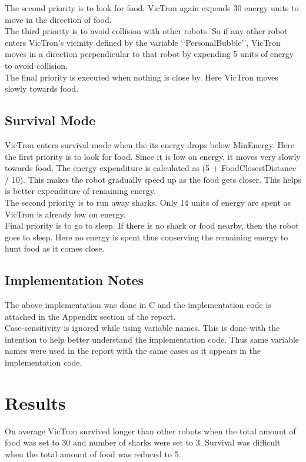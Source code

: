 \documentclass[12pt]{article}
\begin{document}
The second priority is to look for food. VicTron again expends 30 energy units to move in the direction of food. \\

The third priority is to avoid collision with other robots. So if any other robot enters VicTron's vicinity defined by the variable \lq\lq{PersonalBubble}\rq\rq{}, VicTron moves in a direction perpendicular to that robot by expending 5 units of energy to avoid collision. \\

The final priority is executed when nothing is close by. Here VicTron moves slowly towards food. 

\subsection{Survival Mode}
VicTron enters survival mode when the its energy drops below MinEnergy. Here the first priority is to look for food. Since it is low on energy, it moves very slowly towards food. The energy expenditure is calculated as (5 + FoodClosestDistance / 10). This makes the robot gradually speed up as the food gets closer. This helps is better expenditure of remaining energy.  \\

The second priority is to run away sharks. Only 14 units of energy are spent as VicTron is already low on energy. \\

Final priority is to go to sleep. If there is no shark or food nearby, then the robot goes to sleep. Here no energy is spent thus conserving the remaining energy to hunt food as it comes close. 

\subsection{Implementation Notes}
The above implementation was done in C and the implementation code is attached in the Appendix section of the report. \\
Case-sensitivity is ignored while using variable names. This is done with the intention to help better understand the implementation code. Thus same variable names were used in the report with the same cases as it appears in the implementation code. 

\section{Results}
On average VicTron survived longer than other robots when the total amount of food was set to 30 and number of sharks were set to 3. Survival was difficult when the total amount of food was reduced to 5.\\
\end{document}
